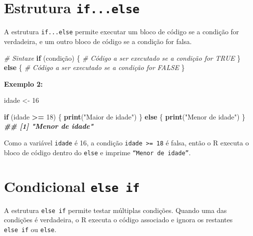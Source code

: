 \documentclass[
]{book}
\newenvironment{Shaded}{\begin{snugshade}}{\end{snugshade}}
\newcommand{\CommentTok}[1]{\textcolor[rgb]{0.56,0.35,0.01}{\textit{#1}}}
\newcommand{\ControlFlowTok}[1]{\textcolor[rgb]{0.13,0.29,0.53}{\textbf{#1}}}
\newcommand{\DecValTok}[1]{\textcolor[rgb]{0.00,0.00,0.81}{#1}}
\newcommand{\DocumentationTok}[1]{\textcolor[rgb]{0.56,0.35,0.01}{\textbf{\textit{#1}}}}
\newcommand{\FunctionTok}[1]{\textcolor[rgb]{0.13,0.29,0.53}{\textbf{#1}}}
\newcommand{\NormalTok}[1]{#1}
\newcommand{\OtherTok}[1]{\textcolor[rgb]{0.56,0.35,0.01}{#1}}
\newcommand{\SpecialCharTok}[1]{\textcolor[rgb]{0.81,0.36,0.00}{\textbf{#1}}}
\newcommand{\StringTok}[1]{\textcolor[rgb]{0.31,0.60,0.02}{#1}}
\begin{document}
\section{\texorpdfstring{Estrutura \texttt{if...else}}{Estrutura if...else}}\label{estrutura-if...else}

A estrutura \texttt{if...else} permite executar um bloco de código se a
condição for verdadeira, e um outro bloco de código se a condição for
falsa.

\begin{Shaded}
\begin{Highlighting}[]
\CommentTok{\# Sintaxe}
\ControlFlowTok{if}\NormalTok{ (condição) \{}
      \CommentTok{\# Código a ser executado se a condição for TRUE}
\NormalTok{\} }\ControlFlowTok{else}\NormalTok{ \{}
      \CommentTok{\# Código a ser executado se a condição for FALSE}
\NormalTok{\}}
\end{Highlighting}
\end{Shaded}

\textbf{Exemplo 2:}

\begin{Shaded}
\begin{Highlighting}[]
\NormalTok{idade }\OtherTok{\textless{}{-}} \DecValTok{16}

\ControlFlowTok{if}\NormalTok{ (idade }\SpecialCharTok{\textgreater{}=} \DecValTok{18}\NormalTok{) \{}
      \FunctionTok{print}\NormalTok{(}\StringTok{"Maior de idade"}\NormalTok{)}
\NormalTok{\} }\ControlFlowTok{else}\NormalTok{ \{}
    \FunctionTok{print}\NormalTok{(}\StringTok{"Menor de idade"}\NormalTok{)}
\NormalTok{\}}
\DocumentationTok{\#\# [1] "Menor de idade"}
\end{Highlighting}
\end{Shaded}

Como a variável \texttt{idade} é 16, a condição \texttt{idade\ \textgreater{}=\ 18} é falsa, então o
R executa o bloco de código dentro do \texttt{else} e imprime
\texttt{“Menor\ de\ idade”}.

\section{\texorpdfstring{Condicional \texttt{else\ if}}{Condicional else if}}\label{condicional-else-if}

A estrutura \texttt{else\ if} permite testar múltiplas condições. Quando uma das
condições é verdadeira, o R executa o código associado e ignora os
restantes \texttt{else\ if} ou \texttt{else}.
\end{document}
